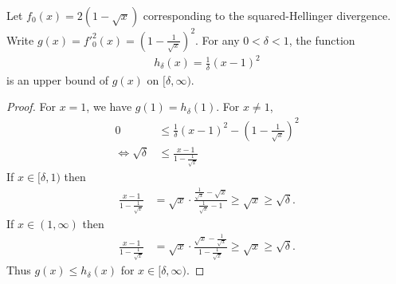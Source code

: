 \begin{lemma}\label{lemma:upper-bound-hellinger}
Let $f_0(x) = 2(1 -\sqrt{x})$ corresponding to the squared-Hellinger divergence. 
Write $g(x) = f'^2_0(x) = (1-\frac{1}{\sqrt{x}})^2$.
For any $0<\delta<1$, the function
\begin{align*}
    h_\delta(x) = \frac{1}{\delta}(x-1)^2 
\end{align*}
is an upper bound of $g(x)$ on $[\delta, \infty)$.
\end{lemma}
\begin{proof}
For $x=1$, we have $g(1)=h_\delta(1)$. 
For $x\not=1$,
\begin{align*}
    0 &\leq \frac{1}{\delta}(x-1)^2 - (1-\frac{1}{\sqrt{x}})^2 \\
    \iff \sqrt{\delta} &\leq \frac{x-1}{1-\frac{1}{\sqrt{x}}}
\end{align*}
If $x \in [\delta, 1)$ then
\begin{align*}
    \frac{x-1}{1-\frac{1}{\sqrt{x}}} &= \sqrt{x} \cdot \frac{\frac{1}{\sqrt{x}} - \sqrt{x}}{\frac{1}{\sqrt{x}}-1} \geq \sqrt{x} \geq \sqrt{\delta}.
\end{align*}
If $x \in (1, \infty)$ then
\begin{align*}
    \frac{x-1}{1-\frac{1}{\sqrt{x}}} &= \sqrt{x} \cdot \frac{\sqrt{x} - \frac{1}{\sqrt{x}}}{1-\frac{1}{\sqrt{x}}} \geq \sqrt{x} \geq \sqrt{\delta}.
\end{align*}
Thus $g(x) \leq h_\delta(x)$ for $x\in[\delta, \infty)$.
\end{proof}

\medskip

